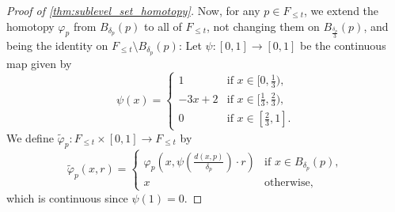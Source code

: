 \begin{proof}[Proof of \cref{thm:sublevel_set_homotopy}]
	Now, for any $p \in F_{\leq t}$, we extend the homotopy $\varphi_{p}$ from $B_{\delta_{p}}(p)$ to all of $F_{\leq t}$, not changing them on $B_{\frac{\delta_{p}}{3}}(p)$, and being the identity on $F_{\leq t} \setminus B_{\delta_{p}}(p)$:
	Let $\psi \colon [0,1] \to [0,1]$ be the continuous map given by
	\[
		\psi(x) =
		\begin{cases}
			1 & \text{if } x \in [0,\frac{1}{3}), \\
			-3x + 2 & \text{if } x \in [\frac{1}{3}, \frac{2}{3}), \\
			0 & \text{if } x \in [\frac{2}{3},1].
		\end{cases}
	\]
	We define $\tilde{\varphi}_{p} \colon F_{\leq t} \times [0,1] \to F_{\leq t}$ by
	\[
		\tilde{\varphi}_{p}(x,r) =
		\begin{cases}
			\varphi_{p} \left( x, \psi \left( \frac{d(x,p)}{\delta_{p}} \right) \cdot r \right)  & \text{if } x \in B_{\delta_{p}}(p), \\
			x & \text{otherwise},
		\end{cases}
	\]
	which is continuous since $\psi(1) = 0$.


\end{proof}

